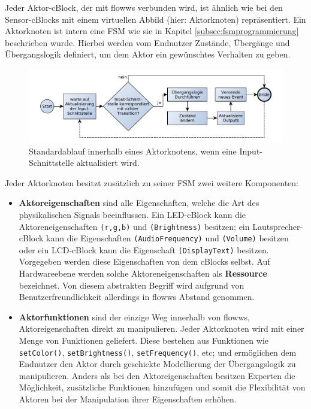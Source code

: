 Jeder Aktor-cBlock, der mit flowws verbunden wird, ist ähnlich wie bei den Sensor-cBlocks mit einem virtuellen Abbild (hier: Aktorknoten) repräsentiert. Ein Aktorknoten ist intern eine \ac{FSM} wie sie in Kapitel \ref{subsec:fsmprogrammierung} beschrieben wurde. Hierbei werden vom Endnutzer Zustände, Übergänge und Übergangslogik definiert, um dem Aktor ein gewünschtes Verhalten zu geben.

 \begin{figure}[h]
  \centering
  \includegraphics[width=1\textwidth]{bilder/chapter4/chapter4_2/aktorblockablauf.pdf}
  \caption{Standardablauf innerhalb eines Aktorknotens, wenn eine Input-Schnittstelle aktualisiert wird.}
  \label{fig:seqaktorblock}
\end{figure}

Jeder Aktorknoten besitzt zusätzlich zu seiner \ac{FSM} zwei weitere Komponenten:
\begin{itemize}
    \item \textbf{Aktoreigenschaften} sind alle Eigenschaften, welche die Art des physikalischen Signals beeinflussen. Ein LED-cBlock kann die Aktoreneigenschaften \texttt{(r,g,b)} und \texttt{(Brightness)} besitzen; ein Lautsprecher-cBlock kann die Eigenschaften \texttt{(AudioFrequency)} und \texttt{(Volume)} besitzen oder ein LCD-cBlock kann die Eigenschaft \texttt{(DisplayText)} besitzen. Vorgegeben werden diese Eigenschaften von dem cBlocks selbst. Auf Hardwareebene werden solche Aktoreneigenschaften als \textbf{Ressource} bezeichnet. Von diesem abstrakten Begriff wird aufgrund von Benutzerfreundlichkeit allerdings in flowws Abstand genommen.
    \item \textbf{Aktorfunktionen} sind der einzige Weg innerhalb von flowws, Aktoreigenschaften direkt zu manipulieren. Jeder Aktorknoten wird mit einer Menge von Funktionen geliefert. Diese bestehen aus Funktionen wie \texttt{setColor()}, \texttt{setBrightness()}, \texttt{setFrequency()}, etc; und ermöglichen dem Endnutzer den Aktor durch geschickte Modellierung der Übergangslogik zu manipulieren. Anders als bei den Aktoreigenschaften besitzen Experten die Möglichkeit, zusätzliche Funktionen hinzufügen und somit die Flexibilität von Aktoren bei der Manipulation ihrer Eigenschaften erhöhen.
\end{itemize}

